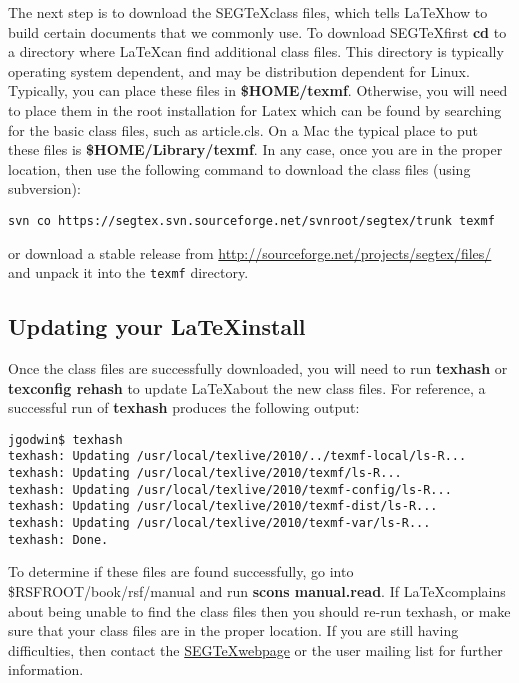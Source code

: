 The next step is to download the SEG\TeX class files, which tells \LaTeX how to build certain documents that we commonly use.  To download SEG\TeX first \textbf{cd} to a directory where \LaTeX can find additional class files.  This directory is typically operating system dependent, and may be distribution dependent for Linux.  Typically, you can place these files in \textbf{\$HOME/texmf}.  Otherwise, you will need to place them in the root installation for Latex which can be found by searching for the basic class files, such as article.cls.  On a Mac the typical place to put these files is \textbf{\$HOME/Library/texmf}.  In any case, once you are in the proper location, then use the following command to download the class files (using subversion):
\begin{verbatim}
svn co https://segtex.svn.sourceforge.net/svnroot/segtex/trunk texmf 
\end{verbatim}
or download a stable release from \url{http://sourceforge.net/projects/segtex/files/} and unpack it into the \texttt{texmf} directory.

\subsection{Updating your \LaTeX install}

Once the class files are successfully downloaded, you will need to run \textbf{texhash} or \textbf{texconfig rehash} to update \LaTeX about the new class files.  For reference, a successful run of \textbf{texhash} produces the following output:

\begin{verbatim}
jgodwin$ texhash
texhash: Updating /usr/local/texlive/2010/../texmf-local/ls-R... 
texhash: Updating /usr/local/texlive/2010/texmf/ls-R... 
texhash: Updating /usr/local/texlive/2010/texmf-config/ls-R... 
texhash: Updating /usr/local/texlive/2010/texmf-dist/ls-R... 
texhash: Updating /usr/local/texlive/2010/texmf-var/ls-R... 
texhash: Done.
\end{verbatim}

To determine if these files are found successfully, go into \$RSFROOT/book/rsf/manual and run \textbf{scons manual.read}.  If \LaTeX complains about being unable to find the class files then you should re-run texhash, or make sure that your class files are in the proper location.  If you are still having difficulties, then contact the \href{http://www.ahay.org/wiki/SEGTeX}{SEG\TeX webpage} or the user mailing list for further information.

